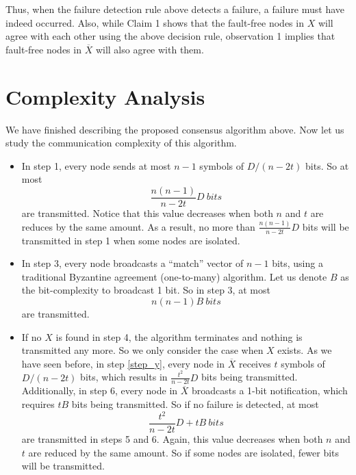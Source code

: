 \documentclass[12pt]{article}
\newcommand{\Xbar}{{\overline X}}
\begin{document}
Thus, when the failure detection rule above detects a failure,
a failure must have indeed occurred. Also, while Claim 1
shows that the fault-free nodes in $X$ will agree with each other
using the above decision rule, observation 1 implies that
fault-free nodes in $\Xbar$ will also agree with them.

\section{Complexity Analysis}\label{sec:complexity}
We have finished describing the proposed consensus algorithm above. Now let us study the communication complexity of this algorithm.

\begin{itemize}
\item In step 1, every node sends at most $n-1$ symbols of $D/(n-2t)$ bits. So at most 
\begin{equation}
\frac{n(n-1)}{n-2t}D~bits
\end{equation}
are transmitted. Notice that this value decreases when both $n$ and $t$ are reduces by the same amount. As a result, no more than $\frac{n(n-1)}{n-2t}D$ bits will be transmitted in step 1 when some nodes are isolated.

\item In step 3, every node broadcasts a ``match'' vector of  $n-1$ bits, using a traditional Byzantine agreement (one-to-many) algorithm. Let us denote $B$ as the bit-complexity to broadcast 1 bit. So in step 3, at most
\begin{equation}
n(n-1)B~bits
\end{equation}
are transmitted.

\item If no $X$ is found in step 4, the algorithm terminates and nothing is transmitted any more. So we only consider the case when $X$ exists. As we have seen before, in step \ref{step_y}, every node in $\Xbar$ receives $t$ symbols of $D/(n-2t)$ bits, which results in $\frac{t^2}{n-2t}D$ bits being transmitted. 
Additionally, in step 6, every node in $\Xbar$ broadcasts a 1-bit notification, which requires $tB$ bits being transmitted. So if no failure is detected, at most
\begin{equation}
\frac{t^2}{n-2t}D + tB~bits
\end{equation}
are transmitted in steps 5 and 6. Again, this value decreases when both $n$ and $t$ are reduced by the same amount. So if some nodes are isolated, fewer bits will be transmitted.


\end{itemize}
\end{document}
